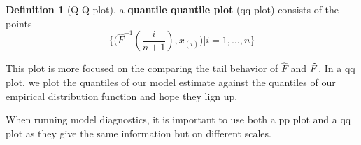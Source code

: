 \documentclass{article}
\theoremstyle{definition}
\theoremstyle{definition}
\newtheorem{definition}{Definition}
\def\inv{^{-1}}
\begin{document}
\begin{definition}[Q-Q plot] a \textbf{quantile quantile plot} (qq plot) consists of the points 
\[ \Bigg\{ \bigg(\hat{F}\inv (\frac{i}{n+1}), x_{(i)}\bigg)| i=1, \hdots, n \Bigg\}\]

This plot is more focused on the comparing the tail behavior of $\hat{F}$ and $\Tilde{F}$. In a qq plot, we plot the quantiles of our model estimate against the quantiles of our empirical distribution function and hope they lign up.
\end{definition}
When running model diagnostics, it is important to use both a pp plot and a qq plot as they give the same information but on different scales.
\end{document}
